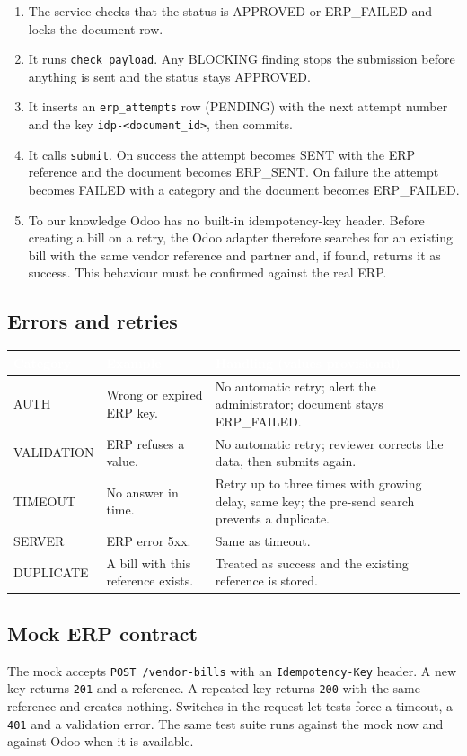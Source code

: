 \documentclass[11pt,a4paper]{report}
\newcommand{\hdr}[1]{\textcolor{white}{\sffamily\bfseries #1}}
\newcommand{\tblstart}{\rowcolors{2}{white}{rowgray}\arrayrulecolor{teal!60}}
\newcommand{\hdrrow}{\rowcolor{navy}}
\begin{document}
\begin{enumerate}
\item The service checks that the status is APPROVED or ERP\_FAILED and locks the document row.
\item It runs \texttt{check\_payload}. Any BLOCKING finding stops the submission before anything is sent and the status stays APPROVED.
\item It inserts an \texttt{erp\_attempts} row (PENDING) with the next attempt number and the key \texttt{idp-<document\_\allowbreak id>}, then commits.
\item It calls \texttt{submit}. On success the attempt becomes SENT with the ERP reference and the document becomes ERP\_SENT. On failure the attempt becomes FAILED with a category and the document becomes ERP\_FAILED.
\item To our knowledge Odoo has no built-in idempotency-key header. Before creating a bill on a retry, the Odoo adapter therefore searches for an existing bill with the same vendor reference and partner and, if found, returns it as success. This behaviour must be confirmed against the real ERP.
\end{enumerate}

\subsection{Errors and retries}
{\tblstart\small
\begin{longtable}{L{2.6cm}L{4.6cm}L{6.6cm}}
\hdrrow \hdr{Category} & \hdr{Example} & \hdr{Handling (values provisional)}\\ \endhead
AUTH & Wrong or expired ERP key. & No automatic retry; alert the administrator; document stays ERP\_FAILED.\\
VALIDATION & ERP refuses a value. & No automatic retry; reviewer corrects the data, then submits again.\\
TIMEOUT & No answer in time. & Retry up to three times with growing delay, same key; the pre-send search prevents a duplicate.\\
SERVER & ERP error 5xx. & Same as timeout.\\
DUPLICATE & A bill with this reference exists. & Treated as success and the existing reference is stored.\\
\hline
\end{longtable}}

\subsection{Mock ERP contract}
The mock accepts \texttt{POST /vendor-bills} with an \texttt{Idempotency-Key} header. A new key returns \texttt{201} and a reference. A repeated key returns \texttt{200} with the same reference and creates nothing. Switches in the request let tests force a timeout, a \texttt{401} and a validation error. The same test suite runs against the mock now and against Odoo when it is available.
\end{document}
